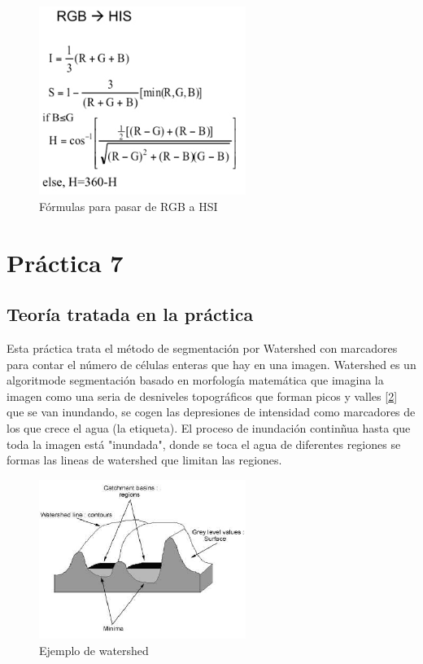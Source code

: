 \documentclass[a4paper,12pt]{report}
\begin{document}
\begin{figure}[h]
\centering
\includegraphics[width=0.6\textwidth]{imagenes/rgb2hsi}
\caption{Fórmulas para pasar de RGB a HSI}
\label{rgb2hsi} 
\end{figure}

\section{ Práctica 7}
\subsection{Teoría tratada en la práctica}

Esta práctica trata el método de segmentación por Watershed con marcadores para contar el número de células enteras que hay en una imagen. Watershed es un algoritmode segmentación basado en morfología matemática que imagina la imagen como una seria de desniveles topográficos que forman picos y valles [\ref{watershed}] que se van inundando, se cogen las depresiones de intensidad como marcadores de los que crece el agua (la etiqueta). El proceso de inundación continñua hasta que toda la imagen está "inundada", donde se toca el agua de diferentes regiones se formas las lineas de watershed que limitan las regiones.\\

\begin{figure}[h]
\centering
\includegraphics[width=0.6\textwidth]{imagenes/valles}
\caption{Ejemplo de watershed}
\label{watershed} 
\end{figure}
\end{document}
